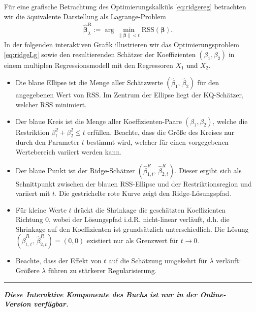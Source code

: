\documentclass[
  a4paper,
  DIV=11,
  oneside]{scrreprt}
\begin{document}
Für eine grafische Betrachtung des Optimierungskalküls
\eqref{eq:ridgereg} betrachten wir die äquivalente Darstellung als
Lagrange-Problem \begin{align}
  \widehat{\boldsymbol{\beta}}^{\mathrm{R}}_\lambda := \arg\min_{\lVert\boldsymbol{\beta}\rVert<t}\mathrm{RSS}(\boldsymbol{\beta}).\label{eq:ridgeLg}
\end{align} In der folgenden interaktiven Grafik illustrieren wir das
Optimierungsproblem \eqref{eq:ridgeLg} sowie den resultierenden Schätzer
der Koeffizienten \((\beta_1, \beta_2)\) in einem multiplen
Regressionsmodell mit den Regressoren \(X_1\) und \(X_2\).

\begin{itemize}
\item
  Die blaue Ellipse ist die Menge aller Schätzwerte
  \(\left(\widehat\beta_{1},\, \widehat\beta_{2}\right)\) für den
  angegebenen Wert von \(\mathrm{RSS}\). Im Zentrum der Ellipse liegt
  der KQ-Schätzer, welcher \(\mathrm{RSS}\) minimiert.
\item
  Der blaue Kreis ist die Menge aller Koeffizienten-Paare
  \((\beta_1, \beta_2)\), welche die Restriktion
  \(\beta_1^2 + \beta_2^2\leq t\) erfüllen. Beachte, dass die Größe des
  Kreises nur durch den Parameter \(t\) bestimmt wird, welcher für einen
  vorgegebenen Wertebereich variiert werden kann.
\item
  Der blaue Punkt ist der Ridge-Schätzer
  \((\widehat\beta^R_{1,t},\, \widehat\beta^R_{2,t})\). Dieser ergibt
  sich als Schnittpunkt zwischen der blauen \(\mathrm{RSS}\)-Ellipse und
  der Restriktionsregion und variiert mit \(t\). Die gestrichelte rote
  Kurve zeigt den Ridge-Lösungspfad.
\item
  Für kleine Werte \(t\) drückt die Shrinkage die geschätzten
  Koeffizienten Richtung 0, wobei der Lösungspfad i.d.R. nicht-linear
  verläuft, d.h. die Shrinkage auf den Koeffizienten ist grundsätzlich
  unterschiedlich. Die Lösung
  \((\widehat\beta^R_{1,t},\, \widehat\beta^R_{2,t}) = (0,0)\) existiert
  nur als Grenzwert für \(t\to0\).
\item
  Beachte, dass der Effekt von \(t\) auf die Schätzung umgekehrt für
  \(\lambda\) verläuft: Größere \(\lambda\) führen zu stärkerer
  Regularisierung.
\end{itemize}

\begin{center}\rule{0.5\linewidth}{0.5pt}\end{center}

\textbf{\emph{Diese Interaktive Komponente des Buchs ist nur in der
Online-Version verfügbar.}}
\end{document}
